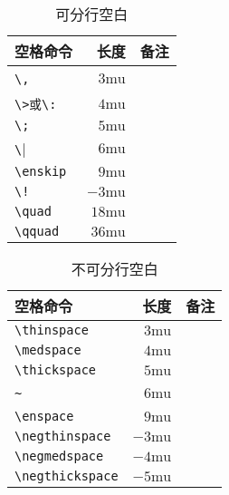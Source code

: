 {\begin{table}[htpb]
	\centering
	\begin{tabular}{lrl} \toprule
		空格命令                  & 长度          & 备注                          \\ \midrule
		\verb|\,|                 & $3\text{mu}$  & \Rightarrow\,\Leftarrow       \\
		\verb|\>或\:|             & $4\text{mu}$  & \Rightarrow\>\Leftarrow       \\
		\verb|\;|                 & $5\text{mu}$  & \Rightarrow\;\Leftarrow       \\
		\verb|\|\textvisiblespace & $6\text{mu}$  & \Rightarrow\ \Leftarrow       \\
		\verb|\enskip|            & $9\text{mu}$  & \Rightarrow\enskip \Leftarrow \\
		\verb|\!|                 & $-3\text{mu}$ & \Rightarrow\!\Leftarrow       \\
		\verb|\quad|              & $18\text{mu}$ & \Rightarrow\quad \Leftarrow   \\
		\verb|\qquad|             & $36\text{mu}$ & \Rightarrow\qquad \Leftarrow  \\ \bottomrule
	\end{tabular}
	\caption{可分行空白}
\end{table}

\begin{table}[H]
	\centering
	\begin{tabular}{lrl} \toprule
		空格命令              & 长度          & 备注                                 \\ \midrule
		\verb|\thinspace|     & $3\text{mu}$  & \Rightarrow\thinspace \Leftarrow     \\
		\verb|\medspace|      & $4\text{mu}$  & \Rightarrow\medspace \Leftarrow      \\
		\verb|\thickspace|    & $5\text{mu}$  & \Rightarrow\thickspace \Leftarrow    \\
		\verb|~|              & $6\text{mu}$  & \Rightarrow~\Leftarrow               \\
		\verb|\enspace|       & $9\text{mu}$  & \Rightarrow\enspace \Leftarrow       \\
		\verb|\negthinspace|  & $-3\text{mu}$ & \Rightarrow\negthinspace \Leftarrow  \\
		\verb|\negmedspace|   & $-4\text{mu}$ & \Rightarrow\negmedspace \Leftarrow   \\
		\verb|\negthickspace| & $-5\text{mu}$ & \Rightarrow\negthickspace \Leftarrow \\
		\bottomrule
	\end{tabular}
	\caption{不可分行空白}
\end{table}

}
